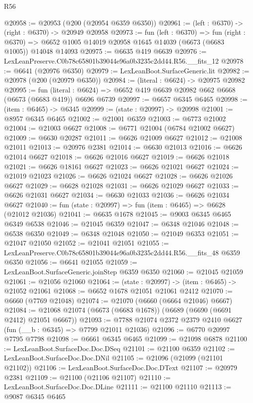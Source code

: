 \begin{lexlean}{R56}
\begin{coremodule}
@20958 := @20953 (@200 (@20954 @6359 @6350))
@20961 := (left : @6370) -> (right : @6370) -> @20949 @20958
@20973 := fun (left : @6370) =>
  fun (right : @6370) => @6652 @1005 @14019 @20958 @1645 @14039 (@6673 (@6683 @1005)) @14048 @14093
@20975 := @6635 @419 @6639
@20976 := LexLeanPreserve.C0b78c65801b39044e96a0b3235c2dd44.R56.__fits_12
@20978 := @6641 (@20976 @6350)
@20979 := LexLeanBoot.SurfaceGeneric.lit
@20982 := @20978 (@200 (@20979 @6350))
@20984 := (literal : @6624) -> @20975 @20982
@20995 := fun (literal : @6624) =>
  @6652 @419 @6639 @20982 @662 @6668 (@6673 (@6683 @419)) @6696 @6739
@20997 := @6657 @6345 @6465
@20998 := (item : @6465) -> @6345
@20999 := (state : @20997) -> @20998
@21001 := @8957 @6345 @6465
@21002 := @21001 @6359
@21003 := @6773 @21002
@21004 := @21003 @6627
@21008 := @6771 @21004 (@6784 @21002 @6627)
@21009 := @6630 @20287
@21011 := @6626 @21009 @6627
@21012 := @21008 @21011
@21013 := @20976 @2381
@21014 := @6630 @21013
@21016 := @6626 @21014 @6627
@21018 := @6626 @21016 @6627
@21019 := @6626 @21018
@21021 := @6626 @18161 @6627
@21023 := @6626 @21021 @6627
@21024 := @21019 @21023
@21026 := @6626 @21024 @6627
@21028 := @6626 @21026 @6627
@21029 := @6628 @21028
@21031 := @6626 @21029 @6627
@21033 := @6626 @21031 @6627
@21034 := @6630 @21033
@21036 := @6626 @21034 @6627
@21040 := fun (state : @20997) => fun (item : @6465) => @6628 (@21012 @21036)
@21041 := @6635 @1678
@21045 := @9003 @6345 @6465 @6349 @6538
@21046 := @21045 @6359
@21047 := @6348 @21046
@21048 := @6538 @6350
@21049 := @6348 @21048
@21050 := @21049 @6353
@21051 := @21047 @21050
@21052 := @21041 @21051
@21055 := LexLeanPreserve.C0b78c65801b39044e96a0b3235c2dd44.R56.__fits_48 @6359 @6350
@21056 := @6641 @21055
@21059 := LexLeanBoot.SurfaceGeneric.joinStep @6359 @6350
@21060 := @21045 @21059
@21061 := @21056 @21060
@21064 := (state : @20997) -> (item : @6465) -> @21052 @21061
@21068 := @6652 @1678 @21051 @21061 @2412
@21070 := @6660 (@7769 @21048)
@21074 := @21070 (@6660 (@6664 @21046) @6667)
@21084 := @21068 @21074 (@6673 (@6683 @1678)) (@6689 (@6690 (@6691 @2412) @21051 @6667))
@21093 := @7788 @21074 @2372 @2379 @2410 @6627 (fun (__b : @6345) => @7799 @21011 @21036)
@21096 := @6770 @20997 @7795 @7798
@21098 := @6661 @6345 @6465
@21099 := @21098 @6878
@21100 := LexLeanBoot.SurfaceDoc.Doc.DSeq
@21101 := @21100 @6359
@21102 := LexLeanBoot.SurfaceDoc.Doc.DNil
@21105 := @21096 (@21099 (@21101 @21102))
@21106 := LexLeanBoot.SurfaceDoc.Doc.DText
@21107 := @20979 @2381
@21109 := @21100 (@21106 @21107)
@21110 := LexLeanBoot.SurfaceDoc.Doc.DLine
@21111 := @21100 @21110
@21113 := @9087 @6345 @6465

\end{coremodule}
\end{lexlean}
